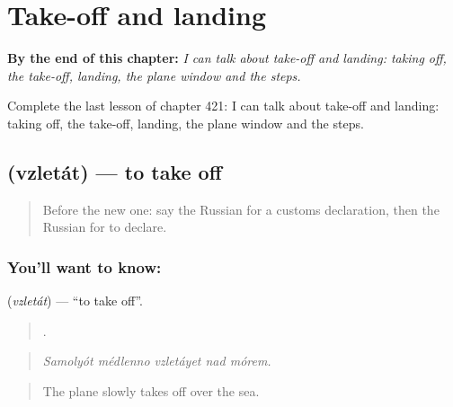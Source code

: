 
\chapter{Take-off and landing}
\label{ch:ru-take-off-and-landing}

\begin{chapteropening}
\textbf{By the end of this chapter:} \emph{I can talk about take-off and landing: taking off, the take-off, landing, the plane window and the steps.}

Complete the last lesson of chapter 421: I can talk about take-off and landing: taking off, the take-off, landing, the plane window and the steps.
\end{chapteropening}

\section[\texorpdfstring{\ru{взлетать} (vzletát)}{взлетать (vzletát)}]{ (vzletát) — to take off}

\label{lesson:RU-C421-vzletat}



\begin{quote}
Before the new one: say the Russian for a customs declaration, then the Russian for to declare.
\end{quote}

\subsection*{You'll want to know: }
\textbf{} (\emph{vzletát}) — \textquotedblleft{}to take off\textquotedblright{}.

\begin{quote}
    .
\end{quote}

\begin{quote}
\emph{Samolyót médlenno vzletáyet nad mórem.}
\end{quote}

\begin{quote}
The plane slowly takes off over the sea.
\end{quote}

